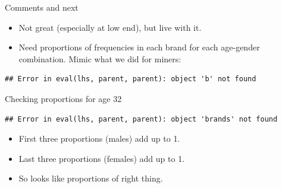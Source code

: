 \documentclass[ignorenonframetext,]{beamer}
\newenvironment{Shaded}{\begin{snugshade}}{\end{snugshade}}
\newcommand{\DataTypeTok}[1]{\textcolor[rgb]{0.13,0.29,0.53}{#1}}
\newcommand{\DecValTok}[1]{\textcolor[rgb]{0.00,0.00,0.81}{#1}}
\newcommand{\KeywordTok}[1]{\textcolor[rgb]{0.13,0.29,0.53}{\textbf{#1}}}
\newcommand{\NormalTok}[1]{#1}
\newcommand{\OperatorTok}[1]{\textcolor[rgb]{0.81,0.36,0.00}{\textbf{#1}}}
\newcommand{\StringTok}[1]{\textcolor[rgb]{0.31,0.60,0.02}{#1}}
\begin{document}
\begin{frame}[fragile]{Comments and next}
\protect\hypertarget{comments-and-next}{}

\begin{itemize}
\item
  Not great (especially at low end), but live with it.
\item
  Need proportions of frequencies in each brand for each age-gender
  combination. Mimic what we did for miners:
\end{itemize}

\begin{Shaded}
\end{Shaded}

\begin{verbatim}
## Error in eval(lhs, parent, parent): object 'b' not found
\end{verbatim}

\end{frame}

\begin{frame}[fragile]{Checking proportions for age 32}
\protect\hypertarget{checking-proportions-for-age-32}{}

\small

\begin{Shaded}
\end{Shaded}

\begin{verbatim}
## Error in eval(lhs, parent, parent): object 'brands' not found
\end{verbatim}

\normalsize

\begin{itemize}
\item
  First three proportions (males) add up to 1.
\item
  Last three proportions (females) add up to 1.
\item
  So looks like proportions of right thing.
\end{itemize}

\end{frame}
\end{document}
